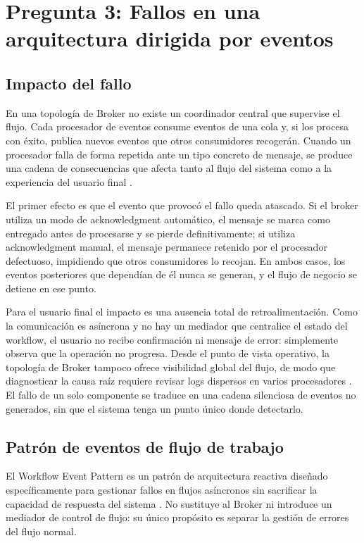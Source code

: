 \section{Pregunta 3: Fallos en una arquitectura dirigida por eventos}

\subsection{Impacto del fallo}
En una topología de Broker no existe un coordinador central que supervise el flujo. Cada procesador de eventos consume eventos de una cola y, si los procesa con éxito, publica nuevos eventos que otros consumidores recogerán. Cuando un procesador falla de forma repetida ante un tipo concreto de mensaje, se produce una cadena de consecuencias que afecta tanto al flujo del sistema como a la experiencia del usuario final \parencite{richards2020fundamentals}.

El primer efecto es que el evento que provocó el fallo queda atascado. Si el broker utiliza un modo de acknowledgment automático, el mensaje se marca como entregado antes de procesarse y se pierde definitivamente; si utiliza acknowledgment manual, el mensaje permanece retenido por el procesador defectuoso, impidiendo que otros consumidores lo recojan. En ambos casos, los eventos posteriores que dependían de él nunca se generan, y el flujo de negocio se detiene en ese punto.

Para el usuario final el impacto es una ausencia total de retroalimentación. Como la comunicación es asíncrona y no hay un mediador que centralice el estado del workflow, el usuario no recibe confirmación ni mensaje de error: simplemente observa que la operación no progresa. Desde el punto de vista operativo, la topología de Broker tampoco ofrece visibilidad global del flujo, de modo que diagnosticar la causa raíz requiere revisar logs dispersos en varios procesadores \parencite{ford2021hard}. El fallo de un solo componente se traduce en una cadena silenciosa de eventos no generados, sin que el sistema tenga un punto único donde detectarlo.

\subsection{Patrón de eventos de flujo de trabajo}
El Workflow Event Pattern es un patrón de arquitectura reactiva diseñado específicamente para gestionar fallos en flujos asíncronos sin sacrificar la capacidad de respuesta del sistema \parencite{richards2020fundamentals}. No sustituye al Broker ni introduce un mediador de control de flujo: su único propósito es separar la gestión de errores del flujo normal.

